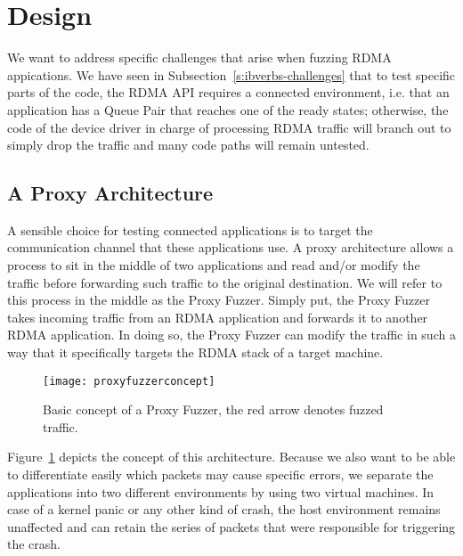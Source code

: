 \section{Design}\label{s:design}


We want to address specific challenges that arise when fuzzing
RDMA appications. We have seen in Subsection~\ref{s:ibverbs-challenges}
that to test specific parts of the code, the RDMA API requires a connected environment, i.e.
that an application has a Queue Pair that reaches one of the ready states; otherwise,
the code of the device driver in charge of processing RDMA traffic will branch out
to simply drop the traffic and many code paths will remain untested.

\subsection{A Proxy Architecture}

A sensible choice for testing connected applications is to
target the communication channel that these applications use.
A proxy architecture allows a process to sit in the middle of two applications
and read and/or modify the traffic before forwarding such traffic to the original destination.
We will refer to this process in the middle as the Proxy Fuzzer. Simply put, the Proxy Fuzzer
takes incoming traffic from an RDMA application and forwards it to another RDMA application.
In doing so, the Proxy Fuzzer can modify the traffic in such a way that it specifically targets the RDMA stack of a target machine.

\begin{figure}[h]
   \centering
   \texttt{[image: proxyfuzzerconcept]}
   \caption[Proxy Fuzzer concept]{Basic concept of a Proxy Fuzzer, the red arrow denotes fuzzed traffic.}\label{fig:fuzzerconcept}
\end{figure}

Figure~\ref{fig:fuzzerconcept} depicts the concept of this architecture. Because we also want to be able to differentiate
easily which packets may cause specific errors, we separate the applications into two different environments by
using two virtual machines. In case of a kernel panic or any other kind of crash, the host environment remains unaffected
and can retain the series of packets that were responsible for triggering the crash.

